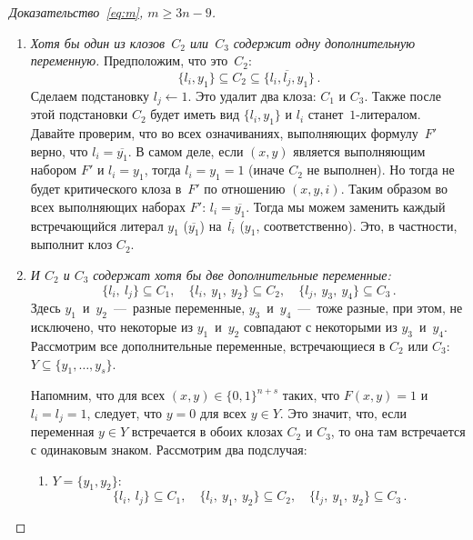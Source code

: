 \begin{proof}[Доказательство~\eqref{eq:m}, $m \ge 3n-9$]
\begin{enumerate}
		\begin{enumerate}
			\item \emph{Хотя бы один из клозов~$C_2$ или~$C_3$ содержит одну дополнительную переменную.} 
			Предположим, что это~$C_2$:
			\[\{l_i,y_1\} \subseteq C_2 \subseteq \{l_i, \overline{l_j}, y_1\}\,. \]
			Сделаем подстановку $l_j \gets 1$. Это удалит два клоза: $C_1$ и $C_3$. Также после этой подстановки $C_2$ будет иметь вид $\{l_i,y_1\}$ и $l_i$
			станет~$1$-литералом. 
			Давайте проверим, что во всех означиваниях, выполняющих формулу~$F'$ верно, что $l_i=\overline{y_1}$. 
			В самом деле, если $(x,y)$ является выполняющим набором $F'$ и $l_i=y_1$, 
			тогда $l_i=y_1=1$ (иначе $C_2$ не выполнен). 
			Но тогда не будет критического клоза в~$F'$ по отношению $(x,y,i)$. 
			Таким образом во всех выполняющих наборах $F'$: $l_i=\overline{y_1}$.
			Тогда мы можем заменить каждый встречающийся литерал $y_1$ ($\overline{y_1}$)
			на~$\overline{l_i}$ ($y_1$, соответственно).
			Это, в частности, выполнит клоз $C_2$.
			
			\item \emph{И $C_2$ и $C_3$ содержат хотя бы две дополнительные переменные:}
			\[
			\{l_i,\ l_j\} \subseteq C_1, \quad
			\{l_i,\ y_1,\ y_2\} \subseteq C_2, \quad
			\{l_j,\ y_3,\ y_4\} \subseteq C_3 \, .
			\]
			Здесь $y_1$~и~$y_2$~---~разные переменные, $y_3$~и~$y_4$~---~тоже разные, 
			при этом, не исключено, что некоторые из $y_1$~и~$y_2$
			совпадают с некоторыми из $y_3$~и~$y_4$. 
			Рассмотрим все дополнительные переменные, встречающиеся в $C_2$ или $C_3$:
			$Y \subseteq \{y_1, \dotsc, y_s\}$.
			
			Напомним, что для всех $(x,y) \in \{0,1\}^{n+s}$ таких, что $F(x,y)=1$ и $l_i=l_j = 1$, следует, что $y=0$ для всех $y \in Y$. 
			Это значит, что, если переменная $y \in Y$  встречается в обоих клозах $C_2$ и $C_3$, то она там встречается с одинаковым знаком.
			Рассмотрим два подслучая:
			
			\begin{enumerate}
				\item $Y=\{y_1,y_2\}$: \[\{l_i,\ l_j\} \subseteq C_1,\quad  \{l_i,\ y_1,\ y_2\} \subseteq C_2,\quad  \{l_j,\ y_1,\ y_2\} \subseteq C_3 \, .\]
				

\end{enumerate}
\end{enumerate}
\end{enumerate}
\end{proof}
